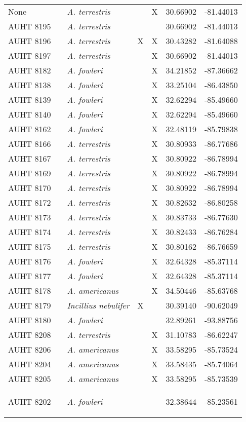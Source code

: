 \begin{longtable}{ lllllll }
None &  & \textit{A. terrestris} &  & X & 30.66902 & -81.44013 \\ 
AUHT 8195 &  & \textit{A. terrestris} &  &  & 30.66902 & -81.44013 \\ 
AUHT 8196 &  & \textit{A. terrestris} & X & X & 30.43282 & -81.64088 \\ 
AUHT 8197 &  & \textit{A. terrestris} &  & X & 30.66902 & -81.44013 \\ 
AUHT 8182 &  & \textit{A. fowleri} &  & X & 34.21852 & -87.36662 \\ 
AUHT 8138 &  & \textit{A. fowleri} &  & X & 33.25104 & -86.43850 \\ 
AUHT 8139 &  & \textit{A. fowleri} &  & X & 32.62294 & -85.49660 \\ 
AUHT 8140 &  & \textit{A. fowleri} &  & X & 32.62294 & -85.49660 \\ 
AUHT 8162 &  & \textit{A. fowleri} &  & X & 32.48119 & -85.79838 \\ 
AUHT 8166 &  & \textit{A. terrestris} &  & X & 30.80933 & -86.77686 \\ 
AUHT 8167 &  & \textit{A. terrestris} &  & X & 30.80922 & -86.78994 \\ 
AUHT 8169 &  & \textit{A. terrestris} &  & X & 30.80922 & -86.78994 \\ 
AUHT 8170 &  & \textit{A. terrestris} &  & X & 30.80922 & -86.78994 \\ 
AUHT 8172 &  & \textit{A. terrestris} &  & X & 30.82632 & -86.80258 \\ 
AUHT 8173 &  & \textit{A. terrestris} &  & X & 30.83733 & -86.77630 \\ 
AUHT 8174 &  & \textit{A. terrestris} &  & X & 30.82433 & -86.76284 \\ 
AUHT 8175 &  & \textit{A. terrestris} &  & X & 30.80162 & -86.76659 \\ 
AUHT 8176 &  & \textit{A. fowleri} &  & X & 32.64328 & -85.37114 \\ 
AUHT 8177 &  & \textit{A. fowleri} &  & X & 32.64328 & -85.37114 \\ 
AUHT 8178 &  & \textit{A. americanus} &  & X & 34.50446 & -85.63768 \\ 
AUHT 8179 &  & \textit{Incillius nebulifer} & X &  & 30.39140 & -90.62049 \\ 
AUHT 8180 &  & \textit{A. fowleri} &  &  & 32.89261 & -93.88756 \\ 
AUHT 8208 &  & \textit{A. terrestris} &  & X & 31.10783 & -86.62247 \\ 
AUHT 8206 &  & \textit{A. americanus} &  & X & 33.58295 & -85.73524 \\ 
AUHT 8204 &  & \textit{A. americanus} &  & X & 33.58435 & -85.74064 \\ 
AUHT 8205 &  & \textit{A. americanus} &  & X & 33.58295 & -85.73539 \\ 
AUHT 8202 &  & \textit{A. fowleri} &  &  & 32.38644 & -85.23561

\label{table:collectedPhylo }
\end{longtable}